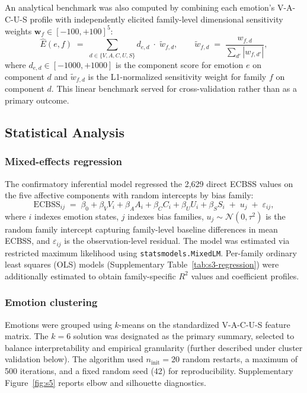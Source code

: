 \documentclass[12pt,a4paper]{article}
\newcommand{\ecbss}{\textsc{ECBSS}}
\newcommand{\vacus}{V-A-C-U-S}
\begin{document}
An analytical benchmark was also computed by combining each emotion's \vacus{} profile with independently elicited family-level dimensional sensitivity weights $\mathbf{w}_f \in [-100, +100]^5$:
\begin{equation}
\hat{E}(e, f) \;=\; \sum_{d \in \{V,A,C,U,S\}} d_{e,d} \;\cdot\; \tilde{w}_{f,d},
\qquad
\tilde{w}_{f,d} \;=\; \frac{w_{f,d}}{\sum_{d'} |w_{f,d'}|},
\label{eq:analytical}
\end{equation}
where $d_{e,d} \in [-1000, +1000]$ is the component score for emotion $e$ on component $d$ and $\tilde{w}_{f,d}$ is the L1-normalized sensitivity weight for family $f$ on component $d$. This linear benchmark served for cross-validation rather than as a primary outcome.

\subsection{Statistical Analysis}

\subsubsection{Mixed-effects regression}

The confirmatory inferential model regressed the 2,629 direct \ecbss{} values on the five affective components with random intercepts by bias family:
\begin{equation}
\text{ECBSS}_{ij} \;=\; \beta_0 + \beta_V V_i + \beta_A A_i + \beta_C C_i + \beta_U U_i + \beta_S S_i \;+\; u_j \;+\; \varepsilon_{ij},
\label{eq:mixedeffects}
\end{equation}
where $i$ indexes emotion states, $j$ indexes bias families, $u_j \sim \mathcal{N}(0, \tau^2)$ is the random family intercept capturing family-level baseline differences in mean \ecbss{}, and $\varepsilon_{ij}$ is the observation-level residual. The model was estimated via restricted maximum likelihood using \texttt{statsmodels.MixedLM}. Per-family ordinary least squares (OLS) models (Supplementary Table~\ref{tab:s3-regression}) were additionally estimated to obtain family-specific $R^2$ values and coefficient profiles.

\subsubsection{Emotion clustering}

Emotions were grouped using $k$-means on the standardized \vacus{} feature matrix. The $k = 6$ solution was designated as the primary summary, selected to balance interpretability and empirical granularity (further described under cluster validation below). The algorithm used $n_{\text{init}} = 20$ random restarts, a maximum of 500 iterations, and a fixed random seed (42) for reproducibility. Supplementary Figure~\ref{fig:s5} reports elbow and silhouette diagnostics.
\end{document}
